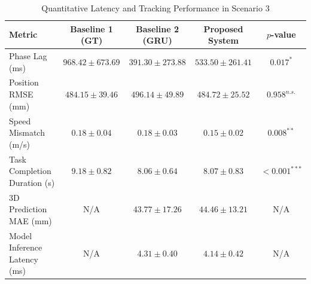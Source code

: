 \begin{table}[htbp]
\centering
\caption{Quantitative Latency and Tracking Performance in Scenario 3}
\label{tab:scenario3_latency}
\begin{tabular}{lcccc}
\toprule
\textbf{Metric} & \textbf{Baseline 1 (GT)} & \textbf{Baseline 2 (GRU)} & \textbf{Proposed System} & \textbf{$p$-value} \\
\midrule
Phase Lag (ms) & $968.42 \pm 673.69$ & $391.30 \pm 273.88$ & $\mathbf{533.50 \pm 261.41}$ & $0.017^{*}$ \\
Position RMSE (mm) & $484.15 \pm 39.46$ & $496.14 \pm 49.89$ & $\mathbf{484.72 \pm 25.52}$ & $0.958^{n.s.}$ \\
Speed Mismatch (m/s) & $0.18 \pm 0.04$ & $0.18 \pm 0.03$ & $\mathbf{0.15 \pm 0.02}$ & $0.008^{**}$ \\
Task Completion Duration (s) & $9.18 \pm 0.82$ & $8.06 \pm 0.64$ & $\mathbf{8.07 \pm 0.83}$ & $< 0.001^{***}$ \\
3D Prediction MAE (mm) & N/A & $43.77 \pm 17.26$ & $\mathbf{44.46 \pm 13.21}$ & N/A \\
Model Inference Latency (ms) & N/A & $4.31 \pm 0.40$ & $\mathbf{4.14 \pm 0.42}$ & N/A \\
\bottomrule
\end{tabular}
\end{table}